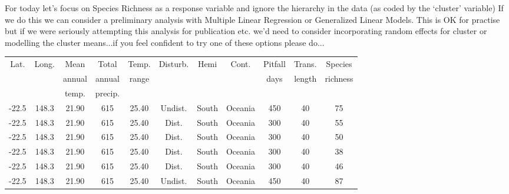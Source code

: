 \documentclass[xcolor=dvipsnames]{beamer}
\begin{document}
\begin{frame}
For today let's focus on Species Richness as a response variable and ignore the hierarchy in the data (as coded by the `cluster' variable)
\newline
\newline
If we do this we can consider a preliminary analysis with Multiple Linear Regression or Generalized Linear Models.
\newline
\newline
This is OK for practise but if we were seriously attempting this analysis for publication etc. we'd need to consider incorporating random effects for cluster or modelling the cluster means...if you feel confident to try one of these options please do...
\begin{table}[ht]
\centering
\tiny
\begin{tabular}{ccccccccccc}
  \hline
Lat. & Long. & Mean & Total & Temp. & Disturb. & Hemi & Cont. & Pitfall & Trans. & Species  \\
 &  & annual & annual & range &  &  &  & days & length & richness  \\
 &  & temp. & precip. &  &  &  &  &  &  &  \\
  \hline
 -22.5 & 148.3 & 21.90 & 615 & 25.40 & Undist. & South & Oceania & 450 & 40 &  75 \\ 
 -22.5 & 148.3 & 21.90 & 615 & 25.40 & Dist. & South & Oceania & 300 & 40 &  55  \\ 
 -22.5 & 148.3 & 21.90 & 615 & 25.40 & Dist. & South & Oceania & 300 & 40 &  50  \\ 
 -22.5 & 148.3 & 21.90 & 615 & 25.40 & Dist. & South & Oceania & 300 & 40 &  38  \\ 
 -22.5 & 148.3 & 21.90 & 615 & 25.40 & Dist. & South & Oceania & 300 & 40 &  46  \\ 
 -22.5 & 148.3 & 21.90 & 615 & 25.40 & Undist. & South & Oceania & 450 & 40 &  87 \\ 
   \hline
\end{tabular}
\end{table}
\end{frame}
\end{document}
